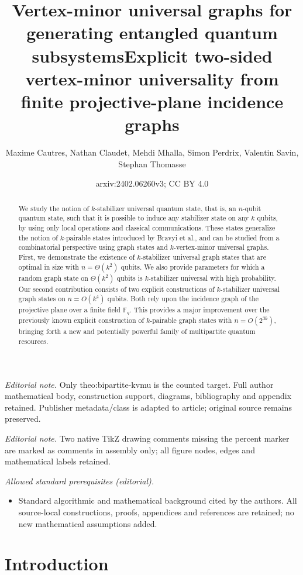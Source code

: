 \documentclass[10pt,a4paper]{article}
\title{Vertex-minor universal graphs for  generating  entangled quantum subsystems}
\title{Explicit two-sided vertex-minor universality from finite projective-plane incidence graphs}
\author{Maxime Cautres, Nathan Claudet, Mehdi Mhalla, Simon Perdrix, Valentin Savin, Stephan Thomasse}
\date{arxiv:2402.06260v3; CC BY 4.0}
\begin{document}
\maketitle
\noindent\textit{Editorial note.} Only theo:bipartite-kvmu is the counted target. Full author mathematical body, construction support, diagrams, bibliography and appendix retained. Publisher metadata/class is adapted to article; original source remains preserved.\par\medskip
\noindent\textit{Editorial note.} Two native TikZ drawing comments missing the percent marker are marked as comments in assembly only; all figure nodes, edges and mathematical labels retained.\par\medskip
\noindent\textit{Allowed standard prerequisites (editorial).}\begin{itemize}
\item Standard algorithmic and mathematical background cited by the authors. All source-local constructions, proofs, appendices and references are retained; no new mathematical assumptions added.
\end{itemize}\medskip
\begin{abstract}
We study the notion of  $k$-stabilizer universal quantum state, that is, an $n$-qubit quantum state, such that it is possible to induce any stabilizer state on any $k$ qubits, by using only local operations and classical communications. These states generalize the notion of $k$-pairable states introduced by Bravyi et al., and can be studied from a combinatorial perspective using graph states and $k$-vertex-minor universal graphs. First, we demonstrate the existence of $k$-stabilizer universal graph states that are optimal in size with $n=\Theta(k^2)$ qubits. We also provide parameters for which a random graph state on $\Theta(k^2)$ qubits is $k$-stabilizer universal with high probability. Our second  contribution consists of two explicit constructions of $k$-stabilizer universal graph states on $n = O(k^4)$ qubits. Both  rely upon the incidence graph of the projective plane over a finite field $\mathbb{F}_q$. This provides a major improvement over the previously known explicit construction of $k$-pairable graph states with $n = O(2^{3k})$, 
bringing forth a new and potentially powerful family of multipartite quantum resources.
\end{abstract}

\section{Introduction}
\end{document}
